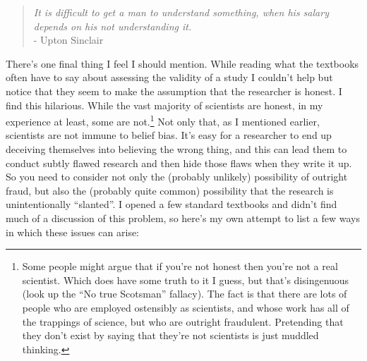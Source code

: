 \documentclass[
]{book}
\begin{document}
\begin{quote}
\emph{It is difficult to get a man to understand something, when his salary depends on his not understanding it.}\\
- Upton Sinclair
\end{quote}

There's one final thing I feel I should mention. While reading what the textbooks often have to say about assessing the validity of a study I couldn't help but notice that they seem to make the assumption that the researcher is honest. I find this hilarious. While the vast majority of scientists are honest, in my experience at least, some are not.\footnote{Some people might argue that if you're not honest then you're not a real scientist. Which does have some truth to it I guess, but that's disingenuous (look up the ``No true Scotsman'' fallacy). The fact is that there are lots of people who are employed ostensibly as scientists, and whose work has all of the trappings of science, but who are outright fraudulent. Pretending that they don't exist by saying that they're not scientists is just muddled thinking.} Not only that, as I mentioned earlier, scientists are not immune to belief bias. It's easy for a researcher to end up deceiving themselves into believing the wrong thing, and this can lead them to conduct subtly flawed research and then hide those flaws when they write it up. So you need to consider not only the (probably unlikely) possibility of outright fraud, but also the (probably quite common) possibility that the research is unintentionally ``slanted''. I opened a few standard textbooks and didn't find much of a discussion of this problem, so here's my own attempt to list a few ways in which these issues can arise:
\end{document}
